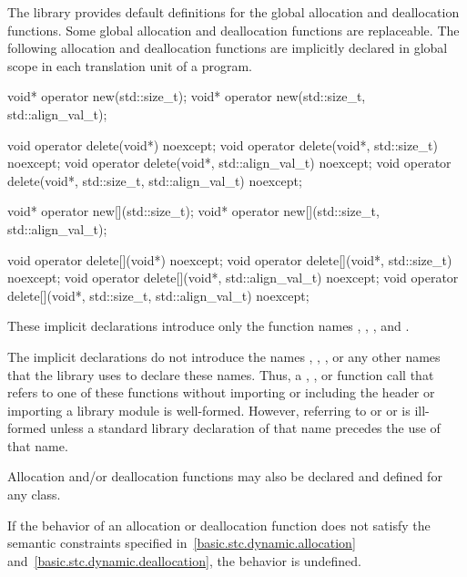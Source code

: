 \pnum
The library provides default definitions for the global allocation and
deallocation functions. Some global allocation and deallocation
functions are replaceable.
The following allocation and deallocation functions
are implicitly declared in global scope in each translation unit of a
program.

\begin{codeblock}
void* operator new(std::size_t);
void* operator new(std::size_t, std::align_val_t);

void operator delete(void*) noexcept;
void operator delete(void*, std::size_t) noexcept;
void operator delete(void*, std::align_val_t) noexcept;
void operator delete(void*, std::size_t, std::align_val_t) noexcept;

void* operator new[](std::size_t);
void* operator new[](std::size_t, std::align_val_t);

void operator delete[](void*) noexcept;
void operator delete[](void*, std::size_t) noexcept;
void operator delete[](void*, std::align_val_t) noexcept;
void operator delete[](void*, std::size_t, std::align_val_t) noexcept;
\end{codeblock}

These implicit declarations introduce only the function names
,
,
, and
.
\begin{note}
The implicit declarations do not introduce
the names ,
,
,
or any other names that the library uses to
declare these names. Thus, a ,
, or function call that refers to one of
these functions without importing or including the header 
or importing a \Cpp{} library module
is well-formed. However, referring to 
or 
or 
is ill-formed unless
a standard library declaration
of that name precedes the use of that name.
\end{note}
Allocation and/or
deallocation functions may also be declared and defined for any
class.

\pnum
If the behavior of an allocation or deallocation function
does not satisfy the semantic constraints
specified in~\ref{basic.stc.dynamic.allocation}
and~\ref{basic.stc.dynamic.deallocation},
the behavior is undefined.

